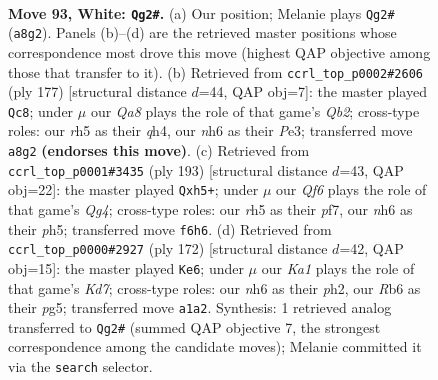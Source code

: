\documentclass[11pt]{article}
\begin{document}
\clearpage

\begin{figure}[p]\centering
\begin{subfigure}{0.46\textwidth}\centering
\resizebox{\linewidth}{!}{%
\newchessgame
\chessboard[
  setfen={Q7/8/1R3Q1n/7r/6k1/8/8/K7 w - - 7 93},
  showmover=false,
  pgfstyle=straightmove, color=movearrow, markmove={a8-g2}
]}
\caption{}
\end{subfigure}\hfill
\begin{subfigure}{0.46\textwidth}\centering
\resizebox{\linewidth}{!}{%
\newchessgame
\chessboard[
  setfen={8/1q3k2/8/8/7Q/4p3/8/3NK3 b - - 5 89},
  showmover=false,
  pgfstyle=straightmove, color=movearrow, markmove={b7-c8}
]}
\caption{}
\end{subfigure}
\\[4pt]
\begin{subfigure}{0.46\textwidth}\centering
\resizebox{\linewidth}{!}{%
\newchessgame
\chessboard[
  setfen={7K/5P2/8/2k3qP/8/8/3N4/8 b - - 4 97},
  showmover=false,
  pgfstyle=straightmove, color=movearrow, markmove={g5-h5}
]}
\caption{}
\end{subfigure}\hfill
\begin{subfigure}{0.46\textwidth}\centering
\resizebox{\linewidth}{!}{%
\newchessgame
\chessboard[
  setfen={6k1/3K4/8/6p1/8/7Q/2r4p/8 w - - 4 87},
  showmover=false,
  pgfstyle=straightmove, color=movearrow, markmove={d7-e6}
]}
\caption{}
\end{subfigure}
\caption{\textbf{Move 93, White: \texttt{Qg2\#}.} (a) Our position; Melanie plays \texttt{Qg2\#} (\texttt{a8g2}). Panels (b)--(d) are the retrieved master positions whose correspondence most drove this move (highest QAP objective among those that transfer to it). (b) Retrieved from \texttt{ccrl\_top\_p0002\#2606} (ply 177) [structural distance $d$=44, QAP obj=7]: the master played \texttt{Qc8}; under $\mu$ our \emph{Qa8} plays the role of that game's \emph{Qb2}; cross-type roles: our \emph{r}h5 as their \emph{q}h4, our \emph{n}h6 as their \emph{P}e3; transferred move \texttt{a8g2} \textbf{(endorses this move)}. (c) Retrieved from \texttt{ccrl\_top\_p0001\#3435} (ply 193) [structural distance $d$=43, QAP obj=22]: the master played \texttt{Qxh5+}; under $\mu$ our \emph{Qf6} plays the role of that game's \emph{Qg4}; cross-type roles: our \emph{r}h5 as their \emph{p}f7, our \emph{n}h6 as their \emph{p}h5; transferred move \texttt{f6h6}. (d) Retrieved from \texttt{ccrl\_top\_p0000\#2927} (ply 172) [structural distance $d$=42, QAP obj=15]: the master played \texttt{Ke6}; under $\mu$ our \emph{Ka1} plays the role of that game's \emph{Kd7}; cross-type roles: our \emph{n}h6 as their \emph{p}h2, our \emph{R}b6 as their \emph{p}g5; transferred move \texttt{a1a2}. Synthesis: 1 retrieved analog transferred to \texttt{Qg2\#} (summed QAP objective 7, the strongest correspondence among the candidate moves); Melanie committed it via the \texttt{search} selector.}
\label{fig:thought-m184}
\end{figure}
\end{document}
